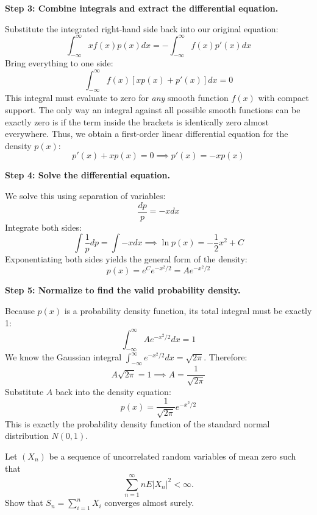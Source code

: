 \begin{solution}
\textbf{Step 3: Combine integrals and extract the differential equation.}

Substitute the integrated right-hand side back into our original equation:
\[ \int_{-\infty}^{\infty} x f(x) p(x) dx = - \int_{-\infty}^{\infty} f(x) p'(x) dx \]
Bring everything to one side:
\[ \int_{-\infty}^{\infty} f(x) [x p(x) + p'(x)] dx = 0 \]
This integral must evaluate to zero for \textit{any} smooth function $f(x)$ with compact support. The only way an integral against all possible smooth functions can be exactly zero is if the term inside the brackets is identically zero almost everywhere. Thus, we obtain a first-order linear differential equation for the density $p(x)$:
\[ p'(x) + x p(x) = 0 \implies p'(x) = -x p(x) \]

\textbf{Step 4: Solve the differential equation.}

We solve this using separation of variables:
\[ \frac{dp}{p} = -x dx \]
Integrate both sides:
\[ \int \frac{1}{p} dp = \int -x dx \implies \ln p(x) = -\frac{1}{2} x^2 + C \]
Exponentiating both sides yields the general form of the density:
\[ p(x) = e^C e^{-x^2/2} = A e^{-x^2/2} \]

\textbf{Step 5: Normalize to find the valid probability density.}

Because $p(x)$ is a probability density function, its total integral must be exactly 1:
\[ \int_{-\infty}^{\infty} A e^{-x^2/2} dx = 1 \]
We know the Gaussian integral $\int_{-\infty}^{\infty} e^{-x^2/2} dx = \sqrt{2\pi}$. Therefore:
\[ A \sqrt{2\pi} = 1 \implies A = \frac{1}{\sqrt{2\pi}} \]
Substitute $A$ back into the density equation:
\[ p(x) = \frac{1}{\sqrt{2\pi}} e^{-x^2/2} \]
This is exactly the probability density function of the standard normal distribution $N(0,1)$.
\end{solution}

\begin{exercise}\label{probability:2014:2}
Let $(X_n)$ be a sequence of uncorrelated random variables of mean zero such that
\[
\sum_{n=1}^\infty nE|X_n|^2 < \infty.
\]
Show that $S_n = \sum_{i=1}^n X_i$ converges almost surely.
\end{exercise}

